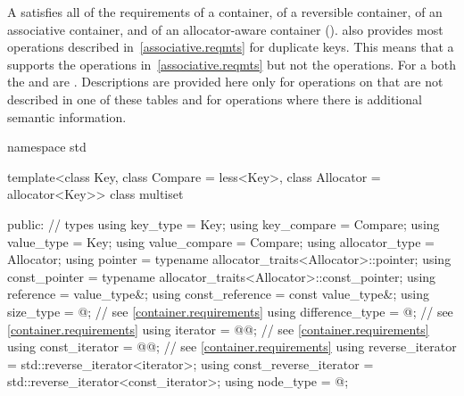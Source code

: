 \pnum
A  satisfies all of the requirements of a container, of a
reversible container, of an associative
container, and of an allocator-aware container
().
also provides most operations described in~\ref{associative.reqmts}
for duplicate keys.
This means that a
supports the
operations in~\ref{associative.reqmts}
but not the
operations.
For a
both the
and
are
.
Descriptions are provided here only for operations on
that are not described in one of these tables
and for operations where there is additional semantic information.

\begin{codeblock}
namespace std {
  template<class Key, class Compare = less<Key>,
           class Allocator = allocator<Key>>
  class multiset {
  public:
    // types
    using key_type               = Key;
    using key_compare            = Compare;
    using value_type             = Key;
    using value_compare          = Compare;
    using allocator_type         = Allocator;
    using pointer                = typename allocator_traits<Allocator>::pointer;
    using const_pointer          = typename allocator_traits<Allocator>::const_pointer;
    using reference              = value_type&;
    using const_reference        = const value_type&;
    using size_type              = @\impdef@; // see \ref{container.requirements}
    using difference_type        = @\impdef@; // see \ref{container.requirements}
    using iterator               = @@; // see \ref{container.requirements}
    using const_iterator         = @@; // see \ref{container.requirements}
    using reverse_iterator       = std::reverse_iterator<iterator>;
    using const_reverse_iterator = std::reverse_iterator<const_iterator>;
    using node_type              = @\unspec@;

}}
\end{codeblock}
